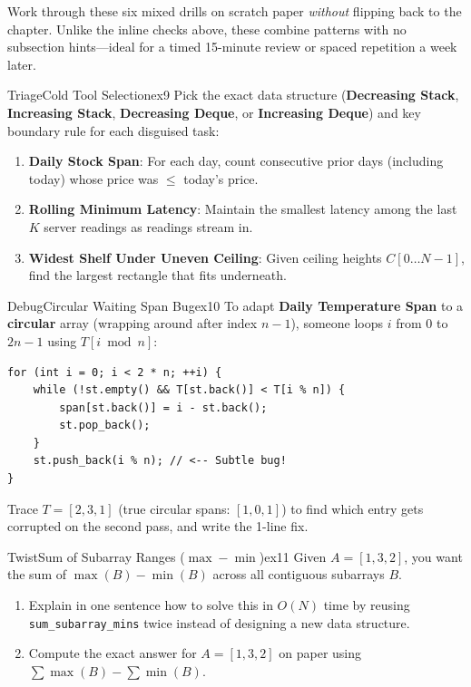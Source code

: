 \documentclass[11pt,a4paper]{article}
\theoremstyle{definition}
\begin{document}
\noindent
Work through these six mixed drills on scratch paper \emph{without} flipping back to the chapter. Unlike the inline checks above, these combine patterns with no subsection hints---ideal for a timed 15-minute review or spaced repetition a week later.

\begin{tryitbox}{Triage}{Cold Tool Selection}{ex9}
Pick the exact data structure (\textbf{Decreasing Stack}, \textbf{Increasing Stack}, \textbf{Decreasing Deque}, or \textbf{Increasing Deque}) and key boundary rule for each disguised task:
\begin{enumerate}
    \item \textbf{Daily Stock Span}: For each day, count consecutive prior days (including today) whose price was $\le$ today's price.
    \item \textbf{Rolling Minimum Latency}: Maintain the smallest latency among the last $K$ server readings as readings stream in.
    \item \textbf{Widest Shelf Under Uneven Ceiling}: Given ceiling heights $C[0 \dots N-1]$, find the largest rectangle that fits underneath.
\end{enumerate}
\end{tryitbox}

\begin{tryitbox}{Debug}{Circular Waiting Span Bug}{ex10}
To adapt \textbf{Daily Temperature Span} to a \textbf{circular} array (wrapping around after index $n-1$), someone loops $i$ from $0$ to $2n - 1$ using $T[i \bmod n]$:
\begin{lstlisting}[numbers=none, xleftmargin=4pt, framexleftmargin=4pt]
for (int i = 0; i < 2 * n; ++i) {
    while (!st.empty() && T[st.back()] < T[i % n]) {
        span[st.back()] = i - st.back();
        st.pop_back();
    }
    st.push_back(i % n); // <-- Subtle bug!
}
\end{lstlisting}
Trace $T = [2, 3, 1]$ (true circular spans: $[1, 0, 1]$) to find which entry gets corrupted on the second pass, and write the 1-line fix.
\end{tryitbox}

\begin{tryitbox}{Twist}{Sum of Subarray Ranges ($\max - \min$)}{ex11}
Given $A = [1, 3, 2]$, you want the sum of $\max(B) - \min(B)$ across all contiguous subarrays $B$.
\begin{enumerate}
    \item Explain in one sentence how to solve this in $O(N)$ time by reusing \texttt{sum\_subarray\_mins} twice instead of designing a new data structure.
    \item Compute the exact answer for $A = [1, 3, 2]$ on paper using $\sum \max(B) - \sum \min(B)$.
\end{enumerate}
\end{tryitbox}
\end{document}
